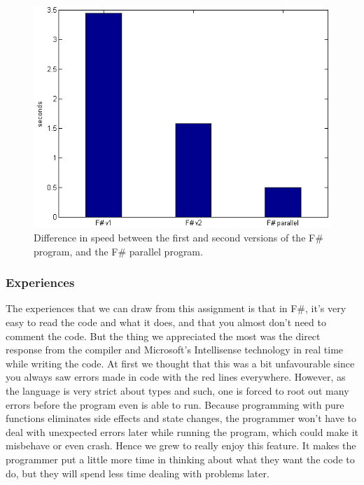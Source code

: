 \documentclass[12pt, a4paper]{article}
\begin{document}
\begin{figure}[!h]
    \includegraphics[scale=0.8]{averageChart2}
    \centering
    \caption{Difference in speed between the first and second versions of the F\# program, and the F\# parallel program.}
\label{fig:averageChart2}
\end{figure}

\newpage

\subsubsection{Experiences}
The experiences that we can draw from this assignment is that in F\#, it's very easy to read the code and what it does, and that you almost don't need to comment the code. But the thing we appreciated the most was the direct response from the compiler and Microsoft's Intellisense technology in real time while writing the code. At first we thought that this was a bit unfavourable since you always saw errors made in code with the red lines everywhere. However, as the language is very strict about types and such, one is forced to root out many errors before the program even is able to run. Because programming with pure functions eliminates side effects and state changes, the programmer won't have to deal with unexpected errors later while running the program, which could make it misbehave or even crash. Hence we grew to really enjoy this feature. It makes the programmer put a little more time in thinking about what they want the code to do, but they will spend less time dealing with problems later.\\
\end{document}
